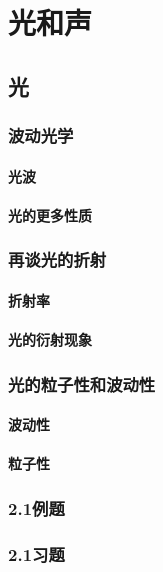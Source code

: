 \chapter{光和声}
\section{光}
\subsection{波动光学}
\subsubsection{光波}
\subsubsection{光的更多性质}
\subsection{再谈光的折射} 
\subsubsection{折射率}
\subsubsection{光的衍射现象}
\subsection{光的粒子性和波动性}
\subsubsection{波动性}
\subsubsection{粒子性}
\subsection{2.1例题}
\subsection{2.1习题}